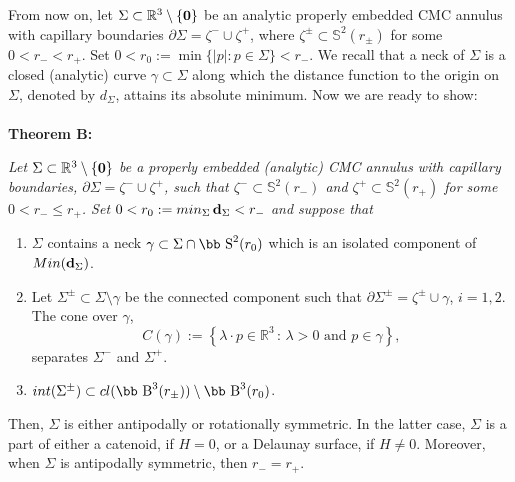 \documentclass[11pt]{article}
\def\b{\hbox{\bb B}}
\def\s{\hbox{\bb S}}
\newcommand{\set}[1]{\left\{#1\right\}}
\numberwithin{equation} {section}
\begin{document}
From now on, let $\Sigma\subset\mathbb{R}^3 \setminus \set{\bf 0}$ be an analytic properly embedded CMC annulus
with capillary boundaries $\partial\Sigma=\zeta^-\cup\zeta^+$, where
$\zeta^\pm\subset\mathbb{S}^2(r_\pm)$ for some $0<r_-<r_+$. Set $0< r_0 := \min\{ |p| : p\in\Sigma \} < r_- $. We recall that a neck of $\Sigma$ is a closed (analytic) curve $\gamma \subset \Sigma$ along which the distance function to the origin on $\Sigma$, denoted by $d_\Sigma$, attains its absolute minimum. Now we are ready to show:
\\
\\
{\bf Theorem B:} {\it Let $\Sigma \subset \mathbb{R}^3 \setminus \set{\bf 0} $ be a properly embedded (analytic) CMC annulus with capillary boundaries, $\partial \Sigma= \zeta ^- \cup \zeta ^+$, such that $\zeta ^- \subset \mathbb{S}^2 (r_-)$ and $\zeta ^+ \subset \mathbb{S}^2 ( r_+)$ for some $0<  r_- \leq r_+$. Set $0< r_0 := {\rm min}_{\Sigma} \, {\bf d}_\Sigma < r_-$ and suppose that 
\begin{enumerate}
\item[(i)] $\Sigma$ contains a neck $\gamma\subset\Sigma\cap\s^2(r_0)$ which is an isolated component of ${\rm Min}({\bf d}_\Sigma)$.

\item[(ii)] Let $\Sigma ^\pm \subset \Sigma \setminus \gamma$ be the connected component such that $\partial \Sigma ^\pm = \zeta ^\pm \cup \gamma$, $i=1,2$. The cone over $\gamma$, 
$$C(\gamma):=\set{ \lambda \cdot p \in \mathbb{R}^3 \, : \, \lambda > 0 \text{ and } p \in \gamma},$$ separates $\Sigma ^-$ and $\Sigma ^+$. 

\item[(iii)]  ${\rm int}(\Sigma ^\pm) \subset \textup{cl}(\b ^3 (r_\pm)) \setminus \b ^3 (r_0)$.	
\end{enumerate}
Then, $\Sigma$ is either antipodally or rotationally symmetric. In the latter case, $\Sigma$ is a part of either a catenoid, if $H=0$, or a Delaunay surface, if $H\neq 0$. Moreover, when $\Sigma$ is antipodally symmetric, then $r_-= r_+$.}
\end{document}
